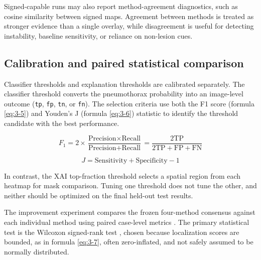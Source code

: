 Signed-capable runs may also report method-agreement diagnostics, such
as cosine similarity between signed maps. Agreement between methods is
treated as stronger evidence than a single overlay, while disagreement
is useful for detecting instability, baseline sensitivity, or reliance
on non-lesion cues.

\hypertarget{calibration-and-paired-statistical-comparison}{%
	\subsection{Calibration and paired statistical
		comparison}\label{calibration-and-paired-statistical-comparison}}

Classifier thresholds and explanation thresholds are calibrated
separately. The classifier threshold converts the pneumothorax
probability into an image-level outcome (\texttt{tp}, \texttt{fp},
\texttt{tn}, or \texttt{fn}). The selection criteria use both the F1 score (formula \eqref{eq:3-5})
and Youden's J (formula \eqref{eq:3-6}) statistic to identify the threshold candidate with the
best performance.

\begin{equation}
	F_1 = 2 \times \frac{\text{Precision} \times \text{Recall}}{\text{Precision} + \text{Recall}} = \frac{2\text{TP}}{2\text{TP} + \text{FP} + \text{FN}}
	\label{eq:3-5}
\end{equation}

\begin{equation}
	J = \text{Sensitivity} + \text{Specificity} - 1
	\label{eq:3-6}
\end{equation}

In contrast, the XAI top-fraction
threshold selects a spatial region from each heatmap for mask
comparison. Tuning one threshold does not tune the other, and neither
should be optimized on the final held-out test results.

The improvement experiment compares the frozen four-method consensus
against each individual method using paired case-level metrics
\cite{ref-demsar-2006}. The primary statistical test is the Wilcoxon
signed-rank test \cite{ref-wilcoxon-1945}, chosen because localization
scores are bounded, as in formula \eqref{eq:3-7}, often zero-inflated, and not safely assumed to be
normally distributed. 

